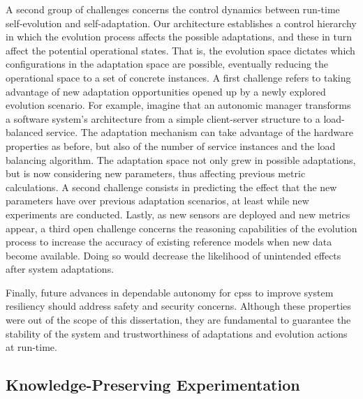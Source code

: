 A second group of challenges concerns the control dynamics between run-time self-evolution and self-adaptation. Our architecture establishes a control hierarchy in which the evolution process affects the possible adaptations, and these in turn affect the potential operational states. That is, the evolution space dictates which configurations in the adaptation space are possible, eventually reducing the operational space to a set of concrete instances. A first challenge refers to taking advantage of new adaptation opportunities opened up by a newly explored evolution scenario. For example, imagine that an autonomic manager transforms a software system's architecture from a simple client-server structure to a load-balanced service. The adaptation mechanism can take advantage of the hardware properties as before, but also of the number of service instances and the load balancing algorithm. The adaptation space not only grew in possible adaptations, but is now considering new parameters, thus affecting previous metric calculations. A second challenge consists in predicting the effect that the new parameters have over previous adaptation scenarios, at least while new experiments are conducted. Lastly, as new sensors are deployed and new metrics appear, a third open challenge concerns the reasoning capabilities of the evolution process to increase the accuracy of existing reference models when new data become available. Doing so would decrease the likelihood of unintended effects after system adaptations.

Finally, future advances in dependable autonomy for \glspl{cps} to improve system resiliency should address safety and security concerns. Although these properties were out of the scope of this dissertation, they are fundamental to guarantee the stability of the system and trustworthiness of adaptations and evolution actions at run-time.

\subsection{Knowledge-Preserving Experimentation}
\label{subsect:conclusions--fw-knowledge-perserving-experimentation}

